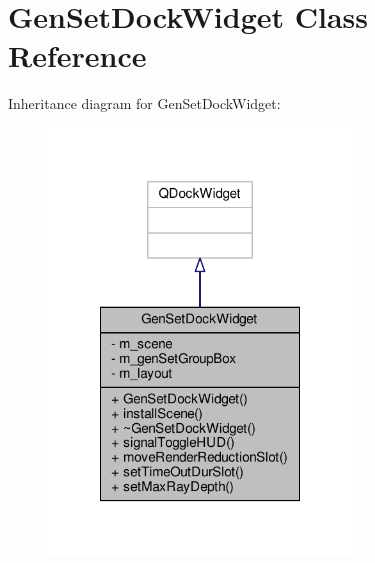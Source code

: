 \hypertarget{class_gen_set_dock_widget}{\section{Gen\-Set\-Dock\-Widget Class Reference}
\label{class_gen_set_dock_widget}
}


Inheritance diagram for Gen\-Set\-Dock\-Widget\-:
\nopagebreak
\begin{figure}[H]
\begin{center}
\leavevmode
\includegraphics[width=228pt]{class_gen_set_dock_widget__inherit__graph}
\end{center}
\end{figure}


